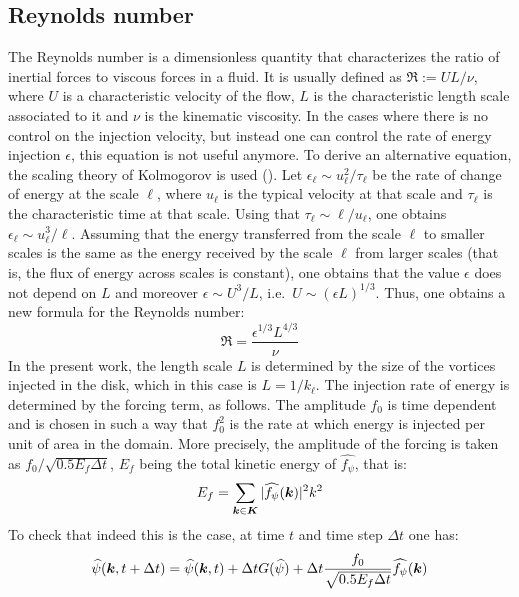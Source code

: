 \documentclass[../main.tex]{subfiles}
\begin{document}
\subsection{Reynolds number}
The Reynolds number is a dimensionless quantity that characterizes the ratio of inertial forces to viscous forces in a fluid. It is usually defined as $\Re:= U L/\nu$, where $U$ is a characteristic velocity of the flow, $L$ is the characteristic length scale associated to it and $\nu$ is the kinematic viscosity. In the cases where there is no control on the injection velocity, but instead one can control the rate of energy injection $\epsilon$, this equation is not useful anymore. To derive an alternative equation, the scaling theory of Kolmogorov is used (\cite{Frisch}). Let $\epsilon_\ell \sim u_\ell^2 / \tau_\ell$ be the rate of change of energy at the scale $\ell$, where $u_\ell$ is the typical velocity at that scale and $\tau_\ell$ is the characteristic time at that scale. Using that $\tau_\ell\sim \ell/u_\ell$, one obtains $\epsilon_\ell \sim u_\ell^3/\ell$. Assuming that the energy transferred from the scale $\ell$ to smaller scales is the same as the energy received by the scale $\ell$ from larger scales (that is, the flux of energy across scales is constant), one obtains that the value $\epsilon$ does not depend on $L$ and moreover $\epsilon \sim U^3/L$, i.e.\ $U \sim {(\epsilon L)}^{1/3}$. Thus, one obtains a new formula for the Reynolds number:
\begin{equation}
	\Re=\frac{\epsilon^{1/3} L^{4/3}}{\nu}
\end{equation}
In the present work, the length scale $L$ is determined by the size of the vortices injected in the disk, which in this case is $L=1/k_\ell$. The injection rate of energy is determined by the forcing term, as follows. The amplitude $f_0$ is time dependent and is chosen in such a way that $f_0^2$ is the rate at which energy is injected per unit of area in the domain. More precisely, the amplitude of the forcing is taken as $f_0/\sqrt{0.5 E_f \Delta t}$, $E_f$ being the total kinetic energy of $\widehat{f_\psi}$, that is:
\begin{equation}
	E_f = \sum_{\boldsymbol{k}\in\boldsymbol{K}} |\widehat{f_\psi}(\boldsymbol{k})|^2 k^2
\end{equation}
To check that indeed this is the case, at time $t$ and time step $\Delta t$ one has:
\begin{equation}
	\widehat{\psi}(\boldsymbol{k},t+\Delta t) = \widehat{\psi}(\boldsymbol{k},t) + \Delta t G(\widehat\psi) + \Delta t \frac{f_0}{\sqrt{0.5 E_f \Delta t}}\widehat{f_\psi}(\boldsymbol{k})
\end{equation}
\end{document}
